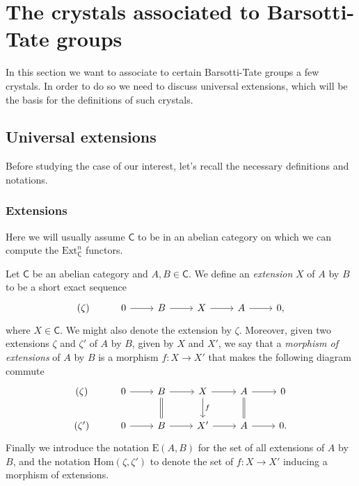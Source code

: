 \documentclass[../Main]{subfiles}
\begin{document}
\section{The crystals associated to Barsotti-Tate groups}
In this section we want to associate to certain Barsotti-Tate groups
a few crystals.
In order to do so we need to discuss universal extensions, which will be the basis
for the definitions of such crystals.



\subsection{Universal extensions}
Before studying the case of our interest, let's recall the necessary definitions
and notations.



\subsubsection{Extensions}
Here we will usually assume $\mathsf{C}$ to be in an abelian category on which
we can compute the $\mathrm{Ext}^n_{\mathsf{C}}$ functors.


\begin{defn}[Extension]
	Let $\mathsf{C}$ be an abelian category and $A,B \in \mathsf{C}$.
	We define an {\em extension} $X$ of $A$ by $B$ to be a short exact sequence
	\begin{equation*}
	\begin{tikzcd}
		(\zeta) &
		0 \arrow[r, "", rightarrow] &
		B \arrow[r, "", rightarrow] &
		X \arrow[r, "", rightarrow] &
		A \arrow[r, "", rightarrow] &
		0
	,\end{tikzcd}
	\end{equation*}
	where $X \in \mathsf{C}$.
	We might also denote the extension by $\zeta$.
	Moreover, given two extensions $\zeta$ and $\zeta'$ of $A$ by $B$,
	given by $X$ and $X'$, we say that a {\em morphism of extensions} of $A$ by $B$
	is a morphism $f\colon X \to X'$ that makes the following diagram commute
	\begin{equation*}
	\begin{tikzcd}
		(\zeta) &
		0 \arrow[r, "", rightarrow] &
		B \arrow[r, "", rightarrow] 
		\arrow[d, "", equals] &
		X \arrow[r, "", rightarrow] 
		\arrow[d, "f", rightarrow] &
		A \arrow[r, "", rightarrow] 
		\arrow[d, "", equals] &
		0\\
		(\zeta') &
		0 \arrow[r, "", rightarrow] &
		B \arrow[r, "", rightarrow] &
		X' \arrow[r, "", rightarrow] &
		A \arrow[r, "", rightarrow] &
		0
	.\end{tikzcd}
	\end{equation*}
	Finally we introduce the notation $\mathrm{E}(A,B)$ for the set of all extensions
	of $A$ by $B$, and the notation $\mathrm{Hom} \left( \zeta, \zeta' \right)$
	to denote the set of $f\colon X \to X'$ inducing a morphism of extensions.
\end{defn}
\end{document}
